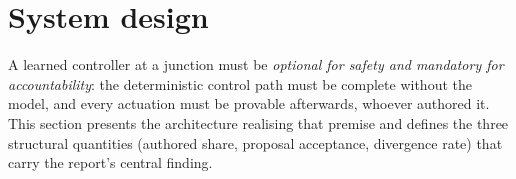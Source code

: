 \section{System design}\label{ch:design}

A learned controller at a junction must be \emph{optional for safety and
mandatory for accountability}: the deterministic control path must be
complete without the model, and every actuation must be provable
afterwards, whoever authored it. This section presents the architecture
realising that premise and defines the three structural quantities
(authored share, proposal acceptance, divergence rate) that carry the
report's central finding.







